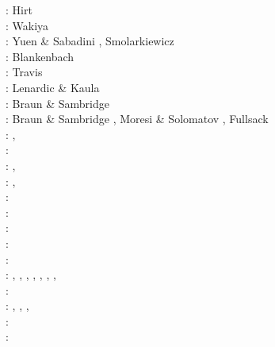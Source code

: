 \begin{scriptsize}
\nineteenseventyfour: Hirt \etal \cite{hiac74}\\
\nineteenseventyfive: Wakiya \cite{waki75a,waki75b}\\
\nineteeneightyfour: Yuen \& Sabadini \cite{yusa84}, Smolarkiewicz \cite{smol84}\\
\nineteeneightynine: Blankenbach \etal \cite{blbc89}\\
\nineteenninety: Travis \etal \cite{trab90}\\
\nineteenninetythree: Lenardic \& Kaula \cite{leka93}\\
\nineteenninetyfour: Braun \& Sambridge \cite{brsa94}\\
\nineteenninetyfive: Braun \& Sambridge \cite{brsa95}, Moresi \& Solomatov \cite{moso95}, 
                     Fullsack \cite{full95}\\
\nineteenninetysix: \cite{zhon96}, \cite{mozg96}\\
\nineteenninetyseven: \cite{rist97}\\
\nineteenninetynine: \cite{lind99}, \cite{bird99}\\
\twothousandone: \cite{modm01}, \cite{vank01}\\
\twothousandtwo: \cite{mudm02}\\
\twothousandthree: \cite{taki03}\cite{modm03}\cite{geyu03}\cite{geyu03b}\cite{taxi03}\cite{scpo03}\\
\twothousandfour: \cite{kaps04}\cite{kasa04}\cite{kaks08}\cite{mumc04}\\
\twothousandfive: \cite{mure05}\\
\twothousandsix: \cite{kapo06}\cite{more06}\cite{onmm06}\cite{mudm06}\cite{tact06}\\
\twothousandseven: 
\cite{toma07},
\cite{chcc07},
\cite{kabe07},
\cite{kaks07},
\cite{moql07},
\cite{geyu07},
\cite{dadh07},
\cite{zldf07}\\
\twothousandeight: \cite{zhmt08}\cite{deka08}\cite{trub08}\cite{krdp08}\cite{mamo08}\cite{gepd98}
      \cite{vack08}\cite{heta08}\cite{brtf08}\cite{daks08}\cite{chzy08}\cite{tack08}\cite{hust08b}\\
\twothousandnine: \cite{king09}, \cite{geum09}, \cite{vemm09}, 
                  \cite{qurj09}\\
\twothousandten: \cite{kaus10}\cite{kamm10}\cite{elga10}\cite{kilv10}\\
\twothousandeleven: \cite{dumg11}\cite{uibb11}\cite{hegc11}\cite{muso11}\cite{dawk11}\cite{lemm11}\\

\end{scriptsize}
